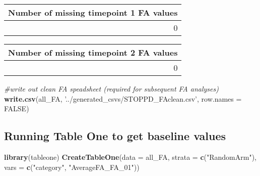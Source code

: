 \documentclass[]{article}
\newenvironment{Shaded}{\begin{snugshade}}{\end{snugshade}}
\newcommand{\KeywordTok}[1]{\textcolor[rgb]{0.13,0.29,0.53}{\textbf{#1}}}
\newcommand{\DataTypeTok}[1]{\textcolor[rgb]{0.13,0.29,0.53}{#1}}
\newcommand{\DecValTok}[1]{\textcolor[rgb]{0.00,0.00,0.81}{#1}}
\newcommand{\StringTok}[1]{\textcolor[rgb]{0.31,0.60,0.02}{#1}}
\newcommand{\CommentTok}[1]{\textcolor[rgb]{0.56,0.35,0.01}{\textit{#1}}}
\newcommand{\OtherTok}[1]{\textcolor[rgb]{0.56,0.35,0.01}{#1}}
\newcommand{\OperatorTok}[1]{\textcolor[rgb]{0.81,0.36,0.00}{\textbf{#1}}}
\newcommand{\NormalTok}[1]{#1}
\theoremstyle{definition}
\theoremstyle{definition}
\theoremstyle{definition}
\theoremstyle{remark}
\begin{document}
\begin{tabular}{r}
\hline
Number of missing timepoint 1 FA values\\
\hline
0\\
\hline
\end{tabular}

\begin{Shaded}
\end{Shaded}

\begin{tabular}{r}
\hline
Number of missing timepoint 2 FA values\\
\hline
0\\
\hline
\end{tabular}

\begin{Shaded}
\begin{Highlighting}[]
\CommentTok{#write out clean FA speadsheet (required for subsequent FA analyses)}
\KeywordTok{write.csv}\NormalTok{(all_FA, }\StringTok{'../generated_csvs/STOPPD_FAclean.csv'}\NormalTok{, }\DataTypeTok{row.names =} \OtherTok{FALSE}\NormalTok{)}
\end{Highlighting}
\end{Shaded}

\subsection{Running Table One to get baseline
values}\label{running-table-one-to-get-baseline-values}

\begin{Shaded}
\begin{Highlighting}[]
\KeywordTok{library}\NormalTok{(tableone)}
\KeywordTok{CreateTableOne}\NormalTok{(}\DataTypeTok{data =}\NormalTok{ all_FA,}
               \DataTypeTok{strata =} \KeywordTok{c}\NormalTok{(}\StringTok{"RandomArm"}\NormalTok{),}
               \DataTypeTok{vars =} \KeywordTok{c}\NormalTok{(}\StringTok{"category"}\NormalTok{, }\StringTok{"AverageFA_FA_01"}\NormalTok{))}
\end{Highlighting}
\end{Shaded}
\end{document}
